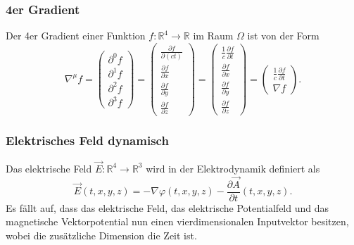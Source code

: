 \subsubsection{4er Gradient}
Der 4er Gradient einer Funktion $f: \mathbb{R}^4 \rightarrow \mathbb{R}$ im Raum $\Omega$ ist von der Form
\[
\renewcommand{\arraystretch}{1.9}
\nabla^\mu f
=
\begin{pmatrix}
	\displaystyle
	\partial^0 f\\
	\displaystyle
	\partial^1 f\\
	\displaystyle
	\partial^2 f\\
	\displaystyle
	\partial^3 f
\end{pmatrix}
=
\begin{pmatrix}
	\displaystyle
	\frac{\partial f}{\partial (ct)}\\
	\displaystyle
	\frac{\partial f}{\partial x}\\
	\displaystyle
	\frac{\partial f}{\partial y}\\
	\displaystyle
	\frac{\partial f}{\partial z}
\end{pmatrix}
=
\begin{pmatrix}
	\displaystyle
	\frac{1}{c}\frac{\partial f}{\partial t}\\
	\displaystyle
	\frac{\partial f}{\partial x}\\
	\displaystyle
	\frac{\partial f}{\partial y}\\
	\displaystyle
	\frac{\partial f}{\partial z}
\end{pmatrix}
=
\begin{pmatrix}
	\displaystyle
	\frac{1}{c}\frac{\partial f}{\partial t}\\
	\displaystyle
	\nabla f
\end{pmatrix}.
\]


\subsubsection{Elektrisches Feld dynamisch}
Das elektrische Feld
\(
\vec{E}: \mathbb{R}^4 \rightarrow \mathbb{R}^3
\)
wird in der Elektrodynamik definiert als
\begin{equation}
	\vec{E}(t,x,y,z)
	=
	- \nabla\varphi(t,x,y,z) - \frac{\partial \vec{A}}{\partial t}(t,x,y,z).
	\label{maxwell:section:definiton_dynamisch_elektrischesFeld}
\end{equation}
Es fällt auf, dass das elektrische Feld, das elektrische Potentialfeld und das magnetische Vektorpotential nun einen vierdimensionalen Inputvektor besitzen, wobei die zusätzliche Dimension die Zeit ist. 

